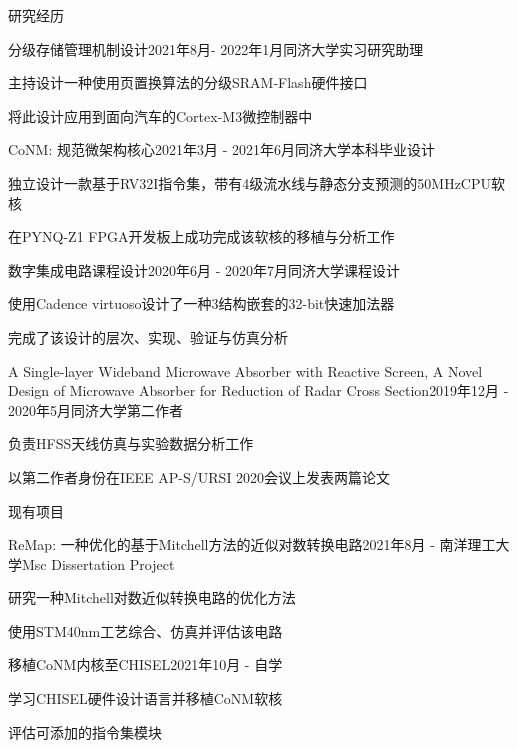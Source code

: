 \documentclass{resume} %
\begin{document}
\begin{rSection}{研究经历}

	\begin{rSubsection}{分级存储管理机制设计}{2021年8月- 2022年1月}{同济大学}{实习研究助理}
		\item 主持设计一种使用页置换算法的分级SRAM-Flash硬件接口
		\item 将此设计应用到面向汽车的Cortex-M3微控制器中
	\end{rSubsection}
	
	\begin{rSubsection}{CoNM: 规范微架构核心}{2021年3月 - 2021年6月}{同济大学}{本科毕业设计}
		\item 独立设计一款基于RV32I指令集，带有4级流水线与静态分支预测的50MHzCPU软核
		\item 在PYNQ-Z1 FPGA开发板上成功完成该软核的移植与分析工作
	\end{rSubsection}

	\begin{rSubsection}{数字集成电路课程设计}{2020年6月 - 2020年7月}{同济大学}{课程设计}
		\item 使用Cadence virtuoso设计了一种3结构嵌套的32-bit快速加法器
		\item 完成了该设计的层次、实现、验证与仿真分析
	\end{rSubsection}

	\begin{rSubsection}{A Single-layer Wideband Microwave Absorber with Reactive Screen, A Novel Design of Microwave Absorber for Reduction of Radar Cross Section}{2019年12月 - 2020年5月}{同济大学}{第二作者}
		\item 负责HFSS天线仿真与实验数据分析工作
		\item 以第二作者身份在IEEE AP-S/URSI 2020会议上发表两篇论文
	\end{rSubsection}

\end{rSection}

\newpage

\begin{rSection}{现有项目}
	
	\begin{rSubsection}{ReMap: 一种优化的基于Mitchell方法的近似对数转换电路}{2021年8月 - }{南洋理工大学}{Msc Dissertation Project}
		\item 研究一种Mitchell对数近似转换电路的优化方法
		\item 使用STM40nm工艺综合、仿真并评估该电路
	\end{rSubsection}
	
	\begin{rSubsection}{移植CoNM内核至CHISEL}{2021年10月 - }{自学}{}
		\item 学习CHISEL硬件设计语言并移植CoNM软核
		\item 评估可添加的指令集模块
	\end{rSubsection}

\end{rSection}
\end{document}

